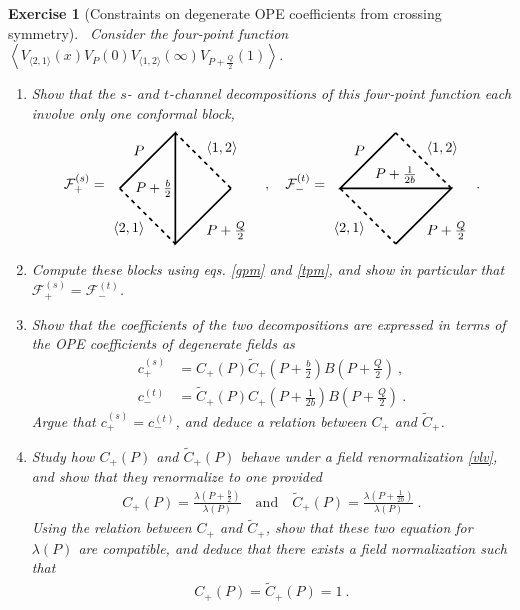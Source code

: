 \documentclass[12pt, a4paper, notitlepage, twoside]{report}
\numberwithin{equation}{section}
\theoremstyle{break}
\newtheorem{exo}{Exercise}[chapter]
\begin{document}
\begin{exo}[Constraints on degenerate OPE coefficients from crossing symmetry]
 ~\label{exonorm}
Consider the four-point function $
 \left\langle V_{\langle 2,1\rangle}(x) V_P(0) V_{\langle 1, 2\rangle}(\infty) V_{P+\frac{Q}{2}}(1)\right\rangle$.
 \begin{enumerate}
  \item Show that the $s$- and $t$-channel decompositions of this four-point function each involve only one 
conformal block,
\begin{align}
\mathcal{F}^{(s)}_+ = 
\begin{tikzpicture}[baseline=(current  bounding  box.center), very thick, scale = .7]
\draw[dashed] (2, 0) -- node [above right] {\!$\langle 1,2 \rangle$} (0, 2);
\draw[dashed] (-2, 0)
-- node [below left] {$\langle 2,1 \rangle$\!} (0, -2); 
\draw (-2, 0) -- node [above left] {$P$\!} (0, 2) 
-- node [left] {$P+\frac{b}{2}\!  $} (0, -2)
-- node [below right] {\!$P+\frac{Q}{2}$} (2, 0);
\end{tikzpicture}
\quad , \quad 
\mathcal{F}^{(t)}_- = 
\begin{tikzpicture}[baseline=(current  bounding  box.center), very thick, scale = .7]
\draw[dashed] (2, 0) -- node [above right] {\!$\langle 1,2 \rangle$} (0, 2);
\draw[dashed] (-2, 0)
-- node [below left] {$\langle 2,1 \rangle$\!} (0, -2); 
\draw (0, 2) -- node [above left] {$P$\!} (-2, 0)
-- node [above] {$P+\frac{1}{2b}  $} (2, 0)
-- node [below right] {\!$P+\frac{Q}{2}$} (0, -2);
\end{tikzpicture}
\ . 
\end{align}
\item Compute these blocks using eqs. \eqref{gpm} and \eqref{tpm}, and show in particular that $\mathcal{F}^{(s)}_+ = \mathcal{F}^{(t)}_-$.

\item Show that the coefficients of the two decompositions are expressed in terms of the OPE coefficients of degenerate fields as 
\begin{align}
 c_+^{(s)} &= C_+(P)\tilde{C}_+(P+\tfrac{b}{2})B(P+\tfrac{Q}{2}) \ ,
 \\
 c_-^{(t)} &= \tilde{C}_+(P)C_+(P+\tfrac{1}{2b})B(P+\tfrac{Q}{2})\ .
\end{align}
Argue that $c_+^{(s)}=c_-^{(t)}$, and deduce a relation between $C_+$ and $\tilde{C}_+$.
\item Study how $C_+(P)$ and $\tilde{C}_+(P)$ behave under a field renormalization \eqref{vlv}, and show that they renormalize to one provided
\begin{align}
 C_+(P) = \frac{\lambda(P+\frac{b}{2})}{\lambda(P)} \quad \text{and} \quad 
\tilde{C}_+(P) = \frac{\lambda(P+\frac{1}{2b})}{\lambda(P)} \ .
\end{align}
Using the relation between $C_+$ and $\tilde{C}_+$, show that these two equation for $\lambda(P)$ are compatible, and deduce that there exists a field normalization such that 
\begin{align}
 C_+(P) = \tilde{C}_+(P) = 1\ .
 \label{cmpo}
\end{align}
 \end{enumerate}
\end{exo}
\end{document}
